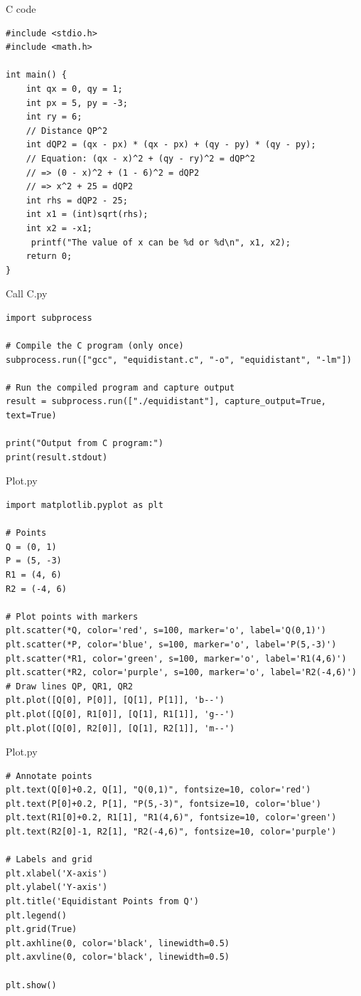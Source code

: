 \documentclass{beamer}
\begin{document}
\begin{frame}[fragile]{C code}
\begin{lstlisting}
#include <stdio.h>
#include <math.h>

int main() {
    int qx = 0, qy = 1;
    int px = 5, py = -3;
    int ry = 6;
    // Distance QP^2
    int dQP2 = (qx - px) * (qx - px) + (qy - py) * (qy - py);
    // Equation: (qx - x)^2 + (qy - ry)^2 = dQP^2
    // => (0 - x)^2 + (1 - 6)^2 = dQP2
    // => x^2 + 25 = dQP2
    int rhs = dQP2 - 25;
    int x1 = (int)sqrt(rhs);
    int x2 = -x1;
     printf("The value of x can be %d or %d\n", x1, x2);
    return 0;
}
\end{lstlisting}    
\end{frame}

\begin{frame}[fragile]{Call C.py}
\begin{lstlisting}
import subprocess

# Compile the C program (only once)
subprocess.run(["gcc", "equidistant.c", "-o", "equidistant", "-lm"])

# Run the compiled program and capture output
result = subprocess.run(["./equidistant"], capture_output=True, text=True)

print("Output from C program:")
print(result.stdout)
\end{lstlisting}
\end{frame}

\begin{frame}[fragile]{Plot.py}
\begin{lstlisting}
import matplotlib.pyplot as plt

# Points
Q = (0, 1)
P = (5, -3)
R1 = (4, 6)
R2 = (-4, 6)

# Plot points with markers
plt.scatter(*Q, color='red', s=100, marker='o', label='Q(0,1)')
plt.scatter(*P, color='blue', s=100, marker='o', label='P(5,-3)')
plt.scatter(*R1, color='green', s=100, marker='o', label='R1(4,6)')
plt.scatter(*R2, color='purple', s=100, marker='o', label='R2(-4,6)')
# Draw lines QP, QR1, QR2
plt.plot([Q[0], P[0]], [Q[1], P[1]], 'b--')
plt.plot([Q[0], R1[0]], [Q[1], R1[1]], 'g--')
plt.plot([Q[0], R2[0]], [Q[1], R2[1]], 'm--')
\end{lstlisting}
\end{frame}

\begin{frame}[fragile]{Plot.py}
\begin{lstlisting}
# Annotate points
plt.text(Q[0]+0.2, Q[1], "Q(0,1)", fontsize=10, color='red')
plt.text(P[0]+0.2, P[1], "P(5,-3)", fontsize=10, color='blue')
plt.text(R1[0]+0.2, R1[1], "R1(4,6)", fontsize=10, color='green')
plt.text(R2[0]-1, R2[1], "R2(-4,6)", fontsize=10, color='purple')

# Labels and grid
plt.xlabel('X-axis')
plt.ylabel('Y-axis')
plt.title('Equidistant Points from Q')
plt.legend()
plt.grid(True)
plt.axhline(0, color='black', linewidth=0.5)
plt.axvline(0, color='black', linewidth=0.5)

plt.show()
\end{lstlisting}
\end{frame}
\end{document}
